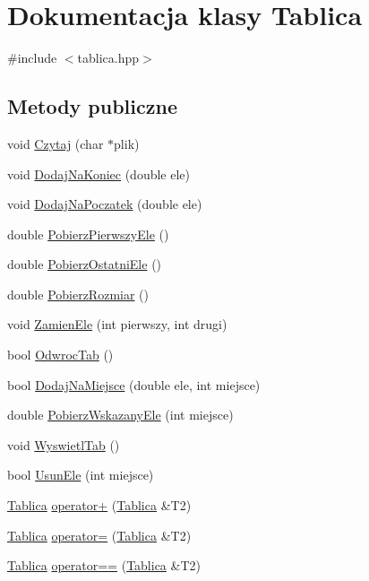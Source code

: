 \hypertarget{class_tablica}{\section{Dokumentacja klasy Tablica}
\label{class_tablica}
}


{\ttfamily \#include $<$tablica.\-hpp$>$}

\subsection*{Metody publiczne}
\begin{DoxyCompactItemize}
\item 
void \hyperlink{class_tablica_a19ca2c588d95ca40a83a3078318bc1ec}{Czytaj} (char $\ast$plik)
\item 
void \hyperlink{class_tablica_a6743db90faaa2a5df74368a90e5a3db4}{Dodaj\-Na\-Koniec} (double ele)
\item 
void \hyperlink{class_tablica_a2f5ae8c1d478b1cdb62faf024940ae07}{Dodaj\-Na\-Poczatek} (double ele)
\item 
double \hyperlink{class_tablica_abc7e36bd34b5bc4a8accfd28515ab096}{Pobierz\-Pierwszy\-Ele} ()
\item 
double \hyperlink{class_tablica_a025f70f455157d7e00328ee3a7740208}{Pobierz\-Ostatni\-Ele} ()
\item 
double \hyperlink{class_tablica_aebdf0ddec6760f83973cee069952e0f3}{Pobierz\-Rozmiar} ()
\item 
void \hyperlink{class_tablica_af1d87fe0f3e512738e92a3d93e96915f}{Zamien\-Ele} (int pierwszy, int drugi)
\item 
bool \hyperlink{class_tablica_a7b1b0165c4412dca32593a085f6d079b}{Odwroc\-Tab} ()
\item 
bool \hyperlink{class_tablica_ad64a404d8b30bda2e31a8948cf71974e}{Dodaj\-Na\-Miejsce} (double ele, int miejsce)
\item 
double \hyperlink{class_tablica_a3889565193c1c9724b6055c0e5fae3c5}{Pobierz\-Wskazany\-Ele} (int miejsce)
\item 
void \hyperlink{class_tablica_a64ede62c24b4ac458df98a0705f0a96f}{Wyswietl\-Tab} ()
\item 
bool \hyperlink{class_tablica_a89fe0ecccfbc932c994bb415f9c78931}{Usun\-Ele} (int miejsce)
\item 
\hyperlink{class_tablica}{Tablica} \hyperlink{class_tablica_a15c072e7160bfbdbc5d103cf0ebd6e76}{operator+} (\hyperlink{class_tablica}{Tablica} \&T2)
\item 
\hyperlink{class_tablica}{Tablica} \hyperlink{class_tablica_a53bd7c9853f01a78ba2aff61ece4ccbf}{operator=} (\hyperlink{class_tablica}{Tablica} \&T2)
\item 
\hyperlink{class_tablica}{Tablica} \hyperlink{class_tablica_ae5d9fdf31df882eae683abc89fec01ad}{operator==} (\hyperlink{class_tablica}{Tablica} \&T2)
\end{DoxyCompactItemize}


